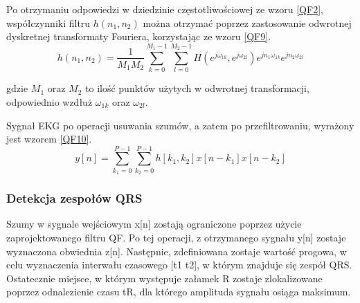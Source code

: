 \documentclass[10pt,a4paper]{article}
\begin{document}
Po otrzymaniu odpowiedzi w dziedzinie częstotliwościowej ze wzoru \ref{QF2}, współczynniki filtru \begin{math}h(n_1,n_2)\end{math} można otrzymać poprzez zastosowanie odwrotnej dyskretnej transformaty Fouriera, korzystając ze wzoru \ref{QF9}.
\medskip
\begin{equation}
\label{QF9}
h(n_1,n_2)=\frac{1}{M_1M_2}\sum_{k=0}^{M_1-1}\sum_{l=0}^{M_2-1}H(e^{j\omega_{1k}},e^{j\omega_{2l}})e^{jn_1\omega_{1k}}e^{jn_2\omega_{2l}}
\end{equation}
\medskip

gdzie \begin{math}M_1\end{math} oraz  \begin{math}M_2\end{math} to ilość punktów użytych w odwrotnej transformacji, odpowiednio wzdłuż \begin{math}\omega_{1k}\end{math}  oraz \begin{math}\omega_{2l}\end{math}.

Sygnał EKG po operacji usuwania szumów, a zatem po przefiltrowaniu, wyrażony jest wzorem \ref{QF10}.
\medskip
\begin{equation}
\label{QF10}
y[n]= \sum_{k_1=0}^{P-1}\sum_{k_2=0}^{P-1}h[k_1,k_2]x[n-k_1]x[n-k_2]
\end{equation}
\bigskip

\subsubsection{Detekcja zespołów QRS}
\bigskip

Szumy w sygnale wejściowym x[n] zostają ograniczone poprzez użycie zaprojektowanego filtru QF. Po tej operacji, z otrzymanego sygnału y[n] zostaje wyznaczona obwiednia z[n]. Następnie, zdefiniowana zostaje wartość progowa, w celu wyznaczenia interwału czasowego [t1 t2], w którym znajduje się zespół QRS. Ostatecznie miejsce, w którym występuje załamek R zostaje zlokalizowane poprzez odnalezienie czasu tR, dla którego amplituda sygnału osiąga maksimum.
\end{document}
